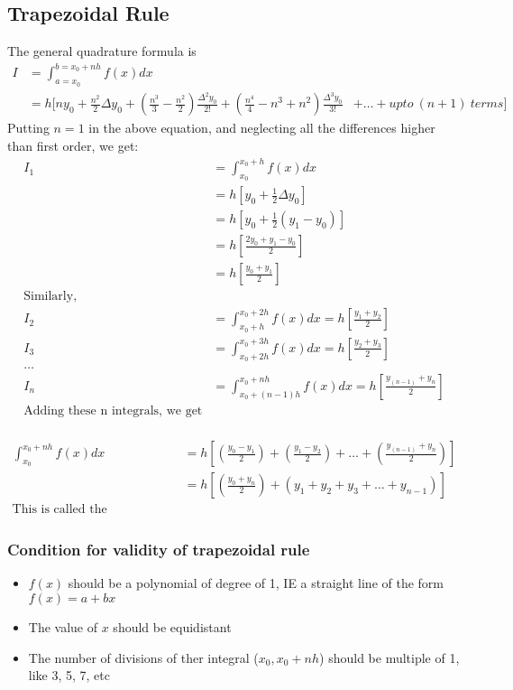\documentclass[10pt, twoside, a4paper]{article}
\begin{document}
\subsection{Trapezoidal Rule}%
The general quadrature formula is
\begin{align*}
I &=\int_{a=x_0}^{b=x_0+nh}f(x)dx\\
  &= h[ny_0+\frac{n^2}{2}\Delta y_0
   + (\frac{n^3}{3}-\frac{n^2}{2})
      \frac{\Delta^2y_0}{2!}
   + (\frac{n^4}{4}-n^3+n^2)
      \frac{\Delta^3y_0}{3!}
    &+ \dots+upto\ (n+1)\ terms]
\end{align*}
Putting $n=1$ in the above equation, and neglecting all the differences higher
than first order, we get:
\begin{align*}
  I_1 &= \int_{x_0}^{x_0+h}f(x)dx\\
      &= h[y_0+\frac{1}{2}\Delta y_0]\\
      &= h[y_0+\frac{1}{2}(y_1-y_0)]\\
      &= h[\frac{2y_0+y_1-y_0}{2}]\\
      &= h[\frac{y_0+y_1}{2}]\\
  \text{Similarly,}\\
  I_2 &= \int_{x_0+h}^{x_0+2h}f(x)dx = h[\frac{y_1+y_2}{2}]\\
  I_3 &= \int_{x_0+2h}^{x_0+3h}f(x)dx = h[\frac{y_2+y_3}{2}]\\
\dots \\
  I_n &= \int_{x_0+(n-1)h}^{x_0+nh}f(x)dx = h[\frac{y_{(n-1)}+y_n}{2}]\\
  \text{Adding these n integrals, we get}\\
\end{align*}
\begin{tcolorbox}
\begin{align*}
  \int_{x_0}^{x_0+nh}f(x)dx &= h[(\frac{y_0-y_1}{2})+(\frac{y_1-y_2}{2})
                             + \dots+(\frac{y_{(n-1)}+y_n}{2})]\\
                            &= h[(\frac{y_0+y_n}{2})+(y_1+y_2+y_3
                             + \dots+y_{n-1})]\\
  \text{This is called the Trapezoidal rule.}
\end{align*}
\end{tcolorbox}

\subsubsection{Condition for validity of trapezoidal rule}
\begin{itemize}
  \item $f(x)$ should be a polynomial of degree of 1, IE a straight line of the
    form $f(x)=a+bx$
  \item The value of $x$ should be equidistant
  \item The number of divisions of ther integral ($x_0,x_0+nh$) should be
    multiple of 1, like 3, 5, 7, etc
\end{itemize}
\end{document}
